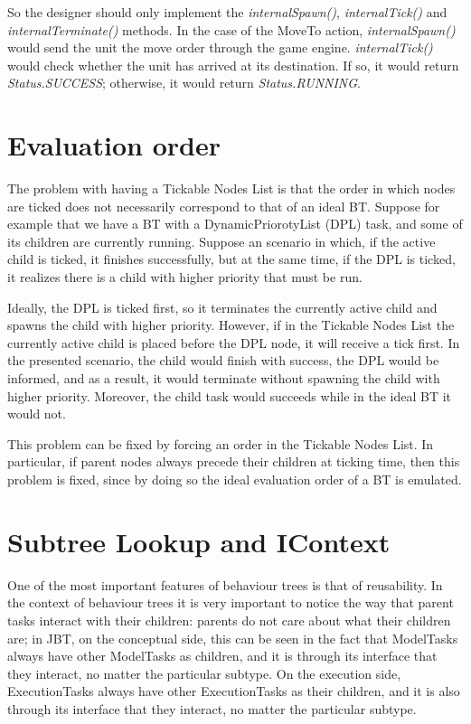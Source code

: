 \documentclass[a4paper,10pt]{article}
\begin{document}
So the designer should only implement the \textit{internalSpawn()}, \textit{internalTick()} and \textit{internalTerminate()} methods. In the case of the MoveTo action, \textit{internalSpawn()} would send the unit the move order through the game engine. \textit{internalTick()} would check whether the unit has arrived at its destination. If so, it would return \textit{Status.SUCCESS}; otherwise, it would return \textit{Status.RUNNING}.

\section{Evaluation order}

The problem with having a Tickable Nodes List is that the order in which nodes are ticked does not necessarily correspond to that of an ideal BT. Suppose for example that we have a BT with a DynamicPriorotyList (DPL) task, and some of its children are currently running. Suppose an scenario in which, if the active child is ticked, it finishes successfully, but at the same time, if the DPL is ticked, it realizes there is a child with higher priority that must be run.

Ideally, the DPL is ticked first, so it terminates the currently active child and spawns the child with higher priority. However, if in the Tickable Nodes List the currently active child is placed before the DPL node, it will receive a tick first. In the presented scenario, the child would finish with success, the DPL would be informed, and as a result, it would terminate without spawning the child with higher priority. Moreover, the child task would succeeds while in the ideal BT it would not.

This problem can be fixed by forcing an order in the Tickable Nodes List. In particular, if parent nodes always precede their children at ticking time, then this problem is fixed, since by doing so the ideal evaluation order of a BT is emulated.

\section{Subtree Lookup and IContext}\label{sec:SubtreeLookupAndIContext}

One of the most important features of behaviour trees is that of reusability. In the context of behaviour trees it is very important to notice the way that parent tasks interact with their children: parents do not care about what their children are; in JBT, on the conceptual side, this can be seen in the fact that ModelTasks always have other ModelTasks as children, and it is through its interface that they interact, no matter the particular subtype. On the execution side, ExecutionTasks always have other ExecutionTasks as their children, and it is also through its interface that they interact, no matter the particular subtype.
\end{document}
